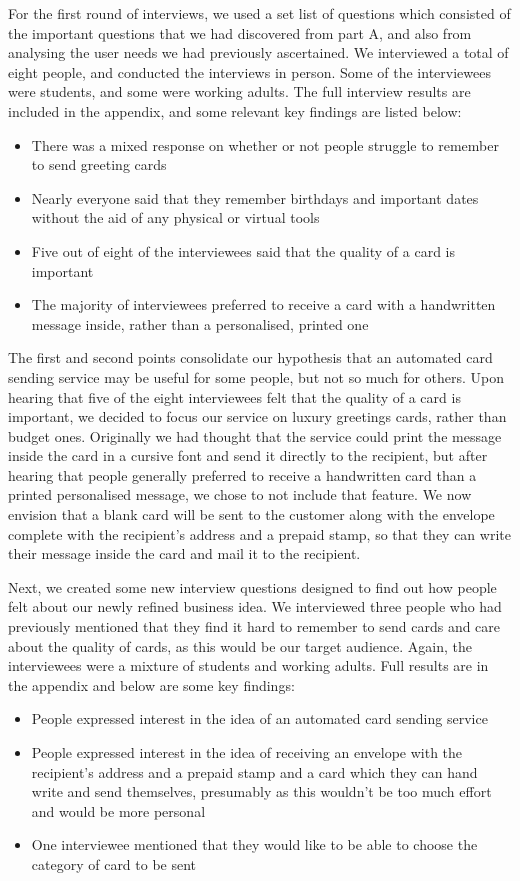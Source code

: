 \documentclass[10pt, a4paper]{article}
\begin{document}
For the first round of interviews, we used a set list of questions which consisted of the important questions that we had discovered from part A, and also from analysing the user needs we had previously ascertained. We interviewed a total of eight people, and conducted the interviews in person. Some of the interviewees were students, and some were working adults. The full interview results are included in the appendix, and some relevant key findings are listed below:
\begin{itemize}
  \item There was a mixed response on whether or not people struggle to remember to send greeting cards
  \item Nearly everyone said that they remember birthdays and important dates without the aid of any physical or virtual tools
  \item Five out of eight of the interviewees said that the quality of a card is important
  \item The majority of interviewees preferred to receive a card with a handwritten message inside, rather than a personalised, printed one
\end{itemize}
The first and second points consolidate our hypothesis that an automated card sending service may be useful for some people, but not so much for others. Upon hearing that five of the eight interviewees felt that the quality of a card is important, we decided to focus our service on luxury greetings cards, rather than budget ones. Originally we had thought that the service could print the message inside the card in a cursive font and send it directly to the recipient, but after hearing that people generally preferred to receive a handwritten card than a printed personalised message, we chose to not include that feature. We now envision that a blank card will be sent to the customer along with the envelope complete with the recipient’s address and a prepaid stamp, so that they can write their message inside the card and mail it to the recipient.

Next, we created some new interview questions designed to find out how people felt about our newly refined business idea. We interviewed three people who had previously mentioned that they find it hard to remember to send cards and care about the quality of cards, as this would be our target audience. Again, the interviewees were a mixture of students and working adults. Full results are in the appendix and below are some key findings:
\begin{itemize}
  \item People expressed interest in the idea of an automated card sending service
  \item People expressed interest in the idea of receiving an envelope with the recipient’s address and a prepaid stamp and a card which they can hand write and send themselves, presumably as this wouldn’t be too much effort and would be more personal
  \item One interviewee mentioned that they would like to be able to choose the category of card to be sent
\end{itemize}
\end{document}
